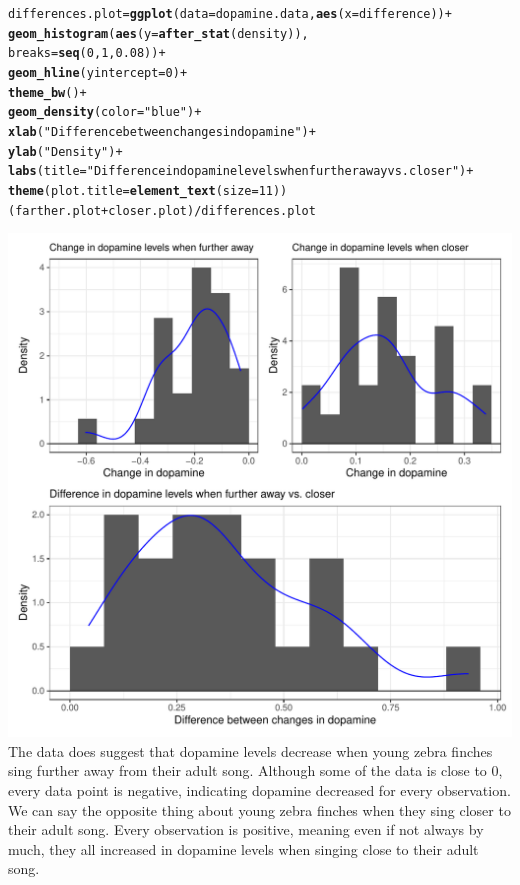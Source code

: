 \documentclass{article}\usepackage[]{graphicx}\usepackage[]{xcolor}
\makeatletter
\def\maxwidth{ %
  \ifdim\Gin@nat@width>\linewidth
    \linewidth
  \else
    \Gin@nat@width
  \fi
}
\newcommand{\hlnum}[1]{\textcolor[rgb]{0.686,0.059,0.569}{#1}}%
\newcommand{\hlsng}[1]{\textcolor[rgb]{0.192,0.494,0.8}{#1}}%
\newcommand{\hlopt}[1]{\textcolor[rgb]{0,0,0}{#1}}%
\newcommand{\hldef}[1]{\textcolor[rgb]{0.345,0.345,0.345}{#1}}%
\newcommand{\hlkwb}[1]{\textcolor[rgb]{0.69,0.353,0.396}{#1}}%
\newcommand{\hlkwc}[1]{\textcolor[rgb]{0.333,0.667,0.333}{#1}}%
\newcommand{\hlkwd}[1]{\textcolor[rgb]{0.737,0.353,0.396}{\textbf{#1}}}%
\newenvironment{kframe}{%
 \def\at@end@of@kframe{}%
 \ifinner\ifhmode%
  \def\at@end@of@kframe{\end{minipage}}%
  \begin{minipage}{\columnwidth}%
 \fi\fi%
 \def\FrameCommand##1{\hskip\@totalleftmargin \hskip-\fboxsep
 \colorbox{shadecolor}{##1}\hskip-\fboxsep
     \hskip-\linewidth \hskip-\@totalleftmargin \hskip\columnwidth}%
 \MakeFramed {\advance\hsize-\width
   \@totalleftmargin\z@ \linewidth\hsize
   \@setminipage}}%
 {\par\unskip\endMakeFramed%
 \at@end@of@kframe}
\newenvironment{knitrout}{}{} %
\makeatother
\begin{document}
\begin{enumerate}
\begin{enumerate}
\begin{knitrout}
\begin{kframe}
\begin{alltt}
\hldef{differences.plot} \hlkwb{=} \hlkwd{ggplot}\hldef{(}\hlkwc{data} \hldef{= dopamine.data,} \hlkwd{aes}\hldef{(}\hlkwc{x}\hldef{=difference))}\hlopt{+}
  \hlkwd{geom_histogram}\hldef{(}\hlkwd{aes}\hldef{(}\hlkwc{y}\hldef{=}\hlkwd{after_stat}\hldef{(density)),}
                 \hlkwc{breaks}\hldef{=}\hlkwd{seq}\hldef{(}\hlnum{0}\hldef{,}\hlnum{1}\hldef{,}\hlnum{0.08}\hldef{))} \hlopt{+}
  \hlkwd{geom_hline}\hldef{(}\hlkwc{yintercept}\hldef{=}\hlnum{0}\hldef{)}\hlopt{+}
  \hlkwd{theme_bw}\hldef{()}\hlopt{+}
  \hlkwd{geom_density}\hldef{(}\hlkwc{color} \hldef{=} \hlsng{"blue"}\hldef{)} \hlopt{+}
  \hlkwd{xlab}\hldef{(}\hlsng{"Difference between changes in dopamine"}\hldef{)}\hlopt{+}
  \hlkwd{ylab}\hldef{(}\hlsng{"Density"}\hldef{)}\hlopt{+}
  \hlkwd{labs}\hldef{(}\hlkwc{title} \hldef{=} \hlsng{"Difference in dopamine levels when further away vs. closer"}\hldef{)} \hlopt{+}
  \hlkwd{theme}\hldef{(}\hlkwc{plot.title} \hldef{=} \hlkwd{element_text}\hldef{(}\hlkwc{size} \hldef{=} \hlnum{11}\hldef{))}
\hldef{(farther.plot} \hlopt{+} \hldef{closer.plot)} \hlopt{/} \hldef{differences.plot}
\end{alltt}
\end{kframe}
\includegraphics[width=\maxwidth]{figure/unnamed-chunk-4-1} 
\end{knitrout}
The data does suggest that dopamine levels decrease when young zebra finches sing further away from their adult song. Although some of the data is close to 0, every data point is negative, indicating dopamine decreased for every observation. We can say the opposite thing about young zebra finches when they sing closer to their adult song. Every observation is positive, meaning even if not always by much, they all increased in dopamine levels when singing close to their adult song.


\end{enumerate}
\end{enumerate}
\end{document}
